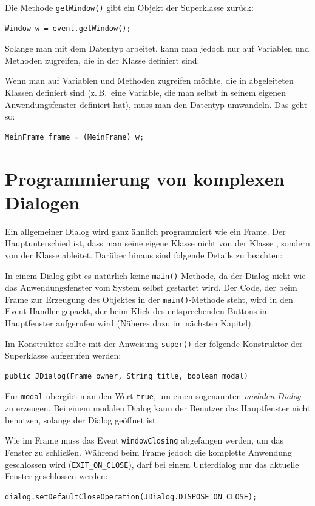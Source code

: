 Die Methode \lstinline|getWindow()| gibt ein Objekt der Superklasse
 zurück:

\begin{lstlisting}
Window w = event.getWindow();
\end{lstlisting}

Solange man mit dem Datentyp  arbeitet, kann man jedoch nur auf
Variablen und Methoden zugreifen, die in der Klasse  definiert
sind.

Wenn man auf Variablen und Methoden zugreifen möchte, die in abgeleiteten
Klassen definiert sind (z.\,B.\ eine Variable, die man selbst in seinem eigenen
Anwendungsfenster definiert hat), muss man den Datentyp umwandeln. Das geht so:

\begin{lstlisting}
MeinFrame frame = (MeinFrame) w;
\end{lstlisting}


\section{Programmierung von komplexen Dialogen}

Ein allgemeiner Dialog wird ganz ähnlich programmiert wie ein Frame. Der
Hauptunterschied ist, dass man seine eigene Klasse nicht von der Klasse
, sondern von der Klasse  ableitet. Darüber
hinaus sind folgende Details zu beachten:

\begin{compactitem}
\item In einem Dialog gibt es natürlich keine \lstinline|main()|-Methode, da der
Dialog nicht wie das Anwendungsfenster vom System selbst gestartet wird. Der
Code, der beim Frame zur Erzeugung des Objektes in der
\lstinline|main()|-Methode steht, wird in den Event-Handler gepackt, der beim
Klick des entsprechenden Buttons im Hauptfenster aufgerufen wird (Näheres dazu
im nächsten Kapitel).

\item Im Konstruktor sollte mit der Anweisung \lstinline|super()| der folgende
Konstruktor der Superklasse  aufgerufen werden:

\begin{lstlisting}
public JDialog(Frame owner, String title, boolean modal)
\end{lstlisting}

Für \lstinline|modal| übergibt man den Wert \lstinline|true|, um einen
sogenannten \emph{modalen Dialog} zu erzeugen. Bei einem modalen Dialog kann der
Benutzer das Hauptfenster nicht benutzen, solange der Dialog geöffnet ist.

\item Wie im Frame muss das Event \lstinline|windowClosing| abgefangen werden,
um das Fenster zu schließen. Während beim Frame jedoch die komplette Anwendung
geschlossen wird (\lstinline|EXIT_ON_CLOSE|), darf bei einem Unterdialog nur das
aktuelle Fenster geschlossen werden:

\begin{lstlisting}
dialog.setDefaultCloseOperation(JDialog.DISPOSE_ON_CLOSE);
\end{lstlisting}
\end{compactitem}
